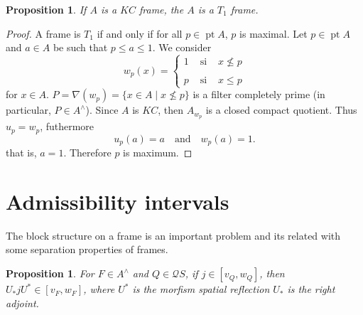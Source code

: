 \documentclass[11pt]{amsart}
\DeclareMathOperator{\pt}{pt}
\theoremstyle{plain}
\newtheorem{prop}[thm]{Proposition}
\theoremstyle{definition}
\begin{document}
\begin{prop}\label{KCT1}
If $A$ is a $KC$ frame, the $A$ is a $T_1$ frame.
\end{prop}

\begin{proof}
A frame is $T_1$ if and only if for all $p\in \pt A$, $p$ is maximal. Let $p\in \pt A$ and $a\in A$ be such that $p\leq a\leq 1$. We consider 
\[
w_p(x)=\left\{\begin{array}{lcc}
1 & \mbox{ si } & x\nleq p\\
\\
p & \mbox{ si } & x\leq p
\end{array}\right.
\]
for $x\in A$. $P=\nabla(w_p)=\{x\in A\mid x\nleq p\}$ is a filter completely prime (in particular, $P\in A^\wedge$). Since $A$ is $KC$, then $A_{w_p}$ is a closed compact quotient. Thus $u_p=w_p$, futhermore
\[
u_p(a)=a\quad \mbox{and}\quad w_p(a)=1.
\]
that is, $a=1$. Therefore $p$ is maximum. 
\end{proof}

\section{Admissibility intervals}

The block structure on a frame is an important problem and its related with some separation properties of frames.

\begin{prop}\label{morfismo}
For $F\in A^\wedge$ and $Q\in\mathcal{Q}S$, if $j\in [v_Q, w_Q]$, then $U_*jU^*\in [v_F, w_F]$, where $U^*$ is the morfism spatial reflection $U_*$ is the right adjoint.
\end{prop}
\end{document}
